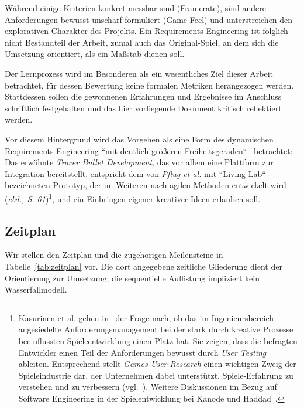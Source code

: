 Während einige Kriterien konkret messbar sind (Framerate), sind andere Anforderungen bewusst unscharf formuliert (Game Feel) und unterstreichen den explorativen Charakter des Projekts.
Ein Requirements Engineering ist folglich nicht Bestandteil der Arbeit, zumal auch das Original-Spiel, an dem sich die Umsetzung orientiert, als ein Maßstab dienen soll.\par

Der Lernprozess wird im Besonderen als ein wesentliches Ziel dieser Arbeit betrachtet, für dessen Bewertung keine formalen Metriken herangezogen werden.
Stattdessen sollen die gewonnenen Erfahrungen und Ergebnisse im Anschluss schriftlich festgehalten und das hier vorliegende Dokument kritisch reflektiert werden.\par

Vor diesem Hintergrund wird das Vorgehen als eine Form des dynamischen Requirements Engineering ``mit deutlich größeren Freiheitsgeraden``~\cite[60]{MRP21} betrachtet: Das erwähnte \textit{Tracer Bullet Development}, das vor allem eine Plattform zur Integration bereitstellt, entspricht dem von \textit{Pflug et al.} mit ``Living Lab`` bezeichneten Prototyp, der im Weiteren nach agilen Methoden entwickelt wird (\textit{ebd., S. 61})\footnote{
    Kasurinen et al. gehen in~\cite[]{KMS14} der Frage nach, ob das im Ingenieursbereich angesiedelte Anforderungsmanagement bei der stark durch kreative Prozesse beeinflussten Spieleentwicklung einen Platz hat. Sie zeigen, dass die befragten Entwickler einen Teil der Anforderungen bewusst durch \textit{User Testing} ableiten. Entsprechend stellt \textit{Games User Research} einen wichtigen Zweig der Spieleindustrie dar, der Unternehmen dabei unterstützt, Spiele-Erfahrung zu verstehen und zu verbessern (vgl.~\cite[26]{Zam18}). Weitere Diskussionen im Bezug auf Software Engineering in der Spielentwicklung bei Kanode und Haddad~\cite[]{KH09}.
}, und ein Einbringen eigener kreativer Ideen erlauben soll.\\

\subsection{Zeitplan}

Wir stellen den Zeitplan und die zugehörigen Meilensteine in Tabelle~\ref{tab:zeitplan} vor.
Die dort angegebene zeitliche Gliederung dient der Orientierung zur Umsetzung; die sequentielle Auflistung impliziert kein Wasserfallmodell.

